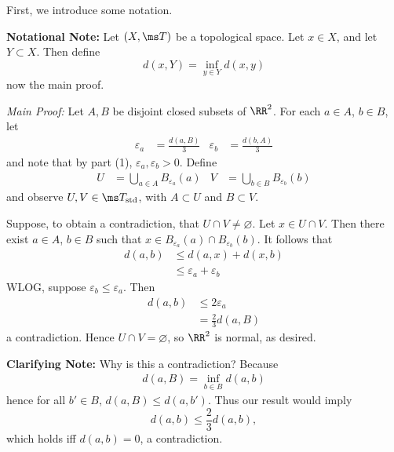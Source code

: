 \documentclass{fkpset}
\newcommand{\tstd}{\ensuremath \ms T_{\rm std}}
\renewcommand{\epsilon}{\varepsilon}
\begin{document}
  \begin{solution}
    First, we introduce some notation.
    \begin{leftbar}
      \textbf{Notational Note:} Let $(X, \ms T)$ be a topological
      space. Let $x \in X$, and let $Y \subset X$. Then define
      \[
        d(x, Y) = \inf_{y \in Y} d(x,y)
      \]
      now the main proof.
    \end{leftbar}

    \emph{Main Proof:} Let $A,B$ be disjoint closed subsets of
    $\RR^2$. For each $a\in A$, $b\in B$, let
    \begin{align*}
      \epsilon_a &= \frac{d(a,B)}{3} & \epsilon_b &= \frac{d(b,A)}{3}
    \end{align*}
    and note that by part (1), $\epsilon_a, \epsilon_b > 0$. Define
    \begin{align*}
      U &= \bigcup_{a \in A} B_{\epsilon_a}(a) & V &= \bigcup_{b \in B} B_{\epsilon_b}(b)
    \end{align*}
    and observe $U, V \in \tstd$, with $A \subset U$ and $B \subset
    V$.

    Suppose, to obtain a contradiction, that $U \cap V \neq
    \varnothing$. Let $x \in U \cap V$. Then there exist $a \in A$, $b
    \in B$ such that $x \in B_{\epsilon_a}(a) \cap B_{\epsilon_b}(b)$.
    It follows that
    \begin{align*}
      d(a,b)
      &\leq d(a,x) + d(x,b) \\
      &\leq \epsilon_a + \epsilon_b
    \end{align*}
    WLOG, suppose $\epsilon_b \leq \epsilon_a$. Then
    \begin{align*}
      d(a,b)
      &\leq 2\epsilon_a \\
      &= \frac{2}{3} d(a,B)
    \end{align*}
    a contradiction. Hence $U \cap V = \varnothing$, so $\RR^2$ is
    normal, as desired.
    \begin{leftbar}
      \color{red} \textbf{Clarifying Note:} Why is this a
      contradiction? Because
      \begin{align*}
        d(a,B) = \inf_{b \in B} d(a,b)
      \end{align*}
      hence for all $b' \in B$, $d(a,B) \leq d(a,b')$. Thus our result
      would imply
      \[
        d(a,b) \leq \frac{2}{3} d(a,b),
      \]
      which holds iff $d(a,b) = 0$, a contradiction.
    \end{leftbar}
  \end{solution}
  \clearpage
\end{document}
